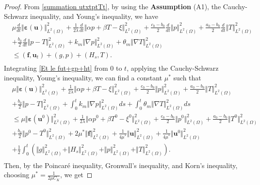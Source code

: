 \documentclass{article}
\numberwithin{equation}{section}
\begin{document}
\begin{proof}
    From \eqref{summation utxtptTt},  by using  the \textbf{Assumption} (A1), the Cauchy-Schwarz inequality, and Young's inequality, we have
\begin{equation}\label{Et le fut+gp+ht}
\begin{aligned} 
& \mu\frac{d}{dt}\Vert\bm\varepsilon(\bm u)\Vert_{L^2(\Omega)}^2  
  +\frac1{2\lambda}\frac{d}{dt}\Vert\alpha p+\beta T-\xi\Vert_{L^2(\Omega)}^2
  +\frac{c_0-b_0}{2}\frac{d}{dt}\Vert p\Vert_{L^2(\Omega)}^2  
 +\frac{a_0-b_0}{2}\frac{d}{dt}\Vert T\Vert_{L^2(\Omega)}^2 \\
&+\frac{b_0}{2}\frac{d}{dt}\Vert p-T\Vert_{L^2(\Omega)}^2  
+ k_m\Vert\nabla p\Vert_{L^2(\Omega)}^2
 +\theta_m\Vert\nabla T\Vert_{L^2(\Omega)}^2\\
&\le   (\bm f, \bm u_t) + (g,p) + ( H_{s},T).\\
\end{aligned}
\end{equation}
Integrating \eqref{Et le fut+gp+ht} from $0$ to $t$, applying the Cauchy-Schwarz inequality, Young's inequality,
 we can find a constant $\mu^*$ such that
 \begin{equation}    
\begin{aligned} 
& \mu \Vert\bm\varepsilon(\bm u)\Vert_{L^2(\Omega)}^2  
  +\frac1{2\lambda} \Vert\alpha p+\beta T-\xi\Vert_{L^2(\Omega)}^2
  +\frac{c_0-b_0}{2} \Vert p\Vert_{L^2(\Omega)}^2  
 +\frac{a_0-b_0}{2} \Vert T\Vert_{L^2(\Omega)}^2 \\
&+\frac{b_0}{2} \Vert p-T\Vert_{L^2(\Omega)}^2  
+ \int_0^t k_m\Vert\nabla p\Vert_{L^2(\Omega)}^2ds
 +\int_0^t \theta_m\Vert\nabla T\Vert_{L^2(\Omega)}^2ds\\
&\le \mu \Vert\bm\varepsilon(\bm u^0)\Vert_{L^2(\Omega)}^2  
  +\frac1{2\lambda} \Vert\alpha p^0+\beta T^0-\xi^0\Vert_{L^2(\Omega)}^2
  +\frac{c_0-b_0}{2} \Vert p^0\Vert_{L^2(\Omega)}^2  
 +\frac{a_0-b_0}{2} \Vert T^0\Vert_{L^2(\Omega)}^2 \\
&+\frac{b_0}{2} \Vert p^0-T^0\Vert_{L^2(\Omega)}^2   
 +  2\mu^* \Vert \bm f\Vert_{L^2(\Omega)}^2
  +\frac1{4\mu^*}   \Vert\bm u\Vert_{L^2(\Omega)}^2 
  +\frac1{4\mu^*}   \Vert\bm u^0\Vert_{L^2(\Omega)}^2 \\
& + \frac12\int_0^t(\Vert g\Vert_{L^2(\Omega)}^2+\Vert  H_{s}\Vert_{L^2(\Omega)}^2+\Vert p\Vert_{L^2(\Omega)}^2+\Vert T\Vert_{L^2(\Omega)}^2) .\\
\end{aligned}
\end{equation}
Then, by the Poincar\'{e} inequality, Gronwall's inequality, and Korn's inequality, choosing $\mu^*=\frac1{2\mu C_K}$, we get

\end{proof}
\end{document}
